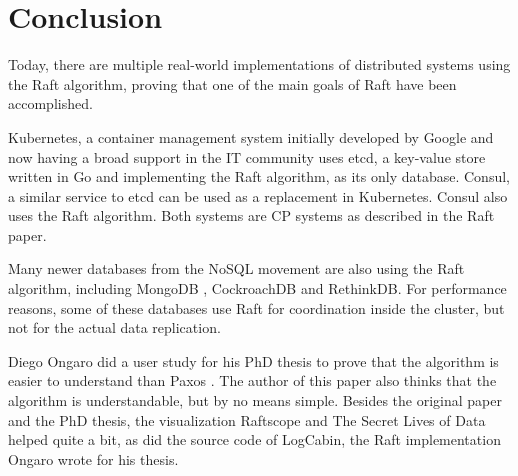 \section{Conclusion}
Today, there are multiple real-world implementations of distributed systems using the Raft algorithm, proving that one of the main goals of Raft have been accomplished.

Kubernetes, a container management system initially developed by Google and now having a broad support in the IT community uses etcd, a key-value store written in Go and implementing the Raft algorithm, as its only database. Consul, a similar service to etcd can be used as a replacement in Kubernetes. Consul also uses the Raft algorithm.
Both systems are CP systems as described in the Raft paper.

Many newer databases from the NoSQL movement are also using the Raft algorithm, including MongoDB \cite{mongodb_raft}, CockroachDB\cite{cockroachdb_raft} and RethinkDB\cite{rethinkdb_raft}. For performance reasons, some of these databases use Raft for coordination inside the cluster, but not for the actual data replication\cite[Development section]{rethinkdb_raft_metadata}.

Diego Ongaro did a user study for his PhD thesis to prove that the algorithm is easier to understand than Paxos \cite[Raft user study chapter]{raft_phd_thesis}. The author of this paper also thinks that the algorithm is understandable, but by no means simple. Besides the original paper and the PhD thesis, the visualization Raftscope \cite{raftscope} and The Secret Lives of Data \cite{the_secret_lives_of_data} helped quite a bit, as did the source code of LogCabin\cite{logcabin}, the Raft implementation Ongaro wrote for his thesis.


 


